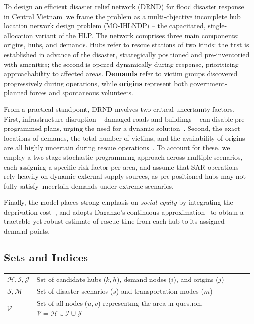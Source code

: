 \documentclass{llncs}
\begin{document}
To design an efficient disaster relief network (DRND) for flood disaster response in Central Vietnam, we frame the problem as a multi-objective incomplete hub location network design problem (MO-IHLNDP) -- the capacitated, single-allocation variant of the HLP. The network comprises three main components: origins, hubs, and demands. Hubs refer to rescue stations of two kinds: the first is established in advance of the disaster, strategically positioned and pre-inventoried with amenities; the second is opened dynamically during response, prioritizing approachability to affected areas. \textbf{Demands} refer to victim groups discovered progressively during operations, while \textbf{origins} represent both government-planned forces and spontaneous volunteers.

From a practical standpoint, DRND involves two critical uncertainty factors. First, infrastructure disruption -- damaged roads and buildings -- can disable pre-programmed plans, urging the need for a dynamic solution~\cite{Yahyaei2019}. Second, the exact locations of demands, the total number of victims, and the availability of origins are all highly uncertain during rescue operations~\cite{tofighi2016humanitarian}. To account for these, we employ a two-stage stochastic programming approach across multiple scenarios, each assigning a specific risk factor per area, and assume that SAR operations rely heavily on dynamic external supply sources, as pre-positioned hubs may not fully satisfy uncertain demands under extreme scenarios.

Finally, the model places strong emphasis on \textit{social equity} by integrating the deprivation cost~\cite{holguin2013appropriate}, and adopts Daganzo's continuous approximation~\cite{daganzo2005logistics} to obtain a tractable yet robust estimate of rescue time from each hub to its assigned demand points.

\subsection{Sets and Indices}
\noindent
\begin{tabular}{l p{}}
$\mathcal{H}, \mathcal{I}, \mathcal{J}$ & Set of candidate hubs ($k, h$), demand nodes ($i$), and  origins ($j$) \\
$\mathcal{S}, \mathcal{M}$ & Set of disaster scenarios ($s$) and transportation modes ($m$) \\
$\mathcal{V}$ & Set of all nodes ($u,v$) representing the area in question, $\mathcal{V} = \mathcal{H} \cup \mathcal{I} \cup \mathcal{J}$ \\
\end{tabular}
\end{document}
